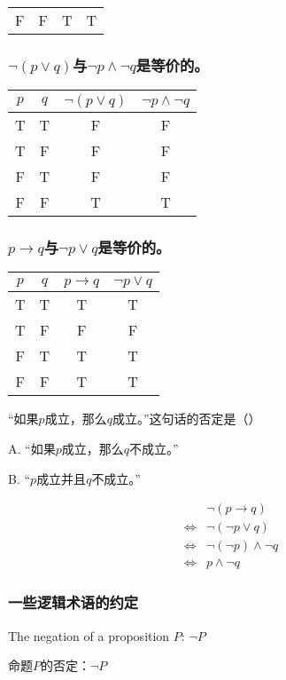 \documentclass{beamer}
\begin{document}
\begin{CJK*}{UTF8}{gbsn}
\begin{frame}
\begin{tabular}{cc|cc}
      F&F&T&T\\      
  \end{tabular}
\end{frame}
\begin{frame}
  \frametitle{$\lnot (p \lor q)$与$\lnot p \land \lnot q$是等价的。}
  \begin{tabular}{cc|cc}
    $p$& $q$&$\lnot (p \lor q)$&$\lnot p \land \lnot q$\\
    \hline
    T&T&F&F\\
    T&F&F&F\\
    F&T&F&F\\
    F&F&T&T\\      
  \end{tabular}
\end{frame}

\begin{frame}
  \frametitle{$p \to q$与$\lnot p \lor q$是等价的。}
  \begin{tabular}{cc|cc}
    $p$& $q$&$p \to q$&$\lnot p \lor q$\\
    \hline
    T&T&T&T\\
    T&F&F&F\\
    F&T&T&T\\
    F&F&T&T\\      
  \end{tabular}
  
\end{frame}

\begin{frame}
  “如果$p$成立，那么$q$成立。”这句话的否定是（）

  A. “如果$p$成立，那么$q$不成立。”

  B. “$p$成立并且$q$不成立。”

\pause
  \begin{equation*}
    \begin{split}
  & \lnot (p \to q)\\
  \Leftrightarrow & \lnot (\lnot p \lor q)\\
   \Leftrightarrow & \lnot (\lnot p) \land \lnot q\\
    \Leftrightarrow & p \land \lnot q
    \end{split}
  \end{equation*}
\end{frame}

\begin{frame}
    \frametitle{一些逻辑术语的约定}
    The negation of a proposition $P$: $\lnot P$

  命题$P$的否定：$\lnot P$


\end{frame}
\end{CJK*}
\end{document}

